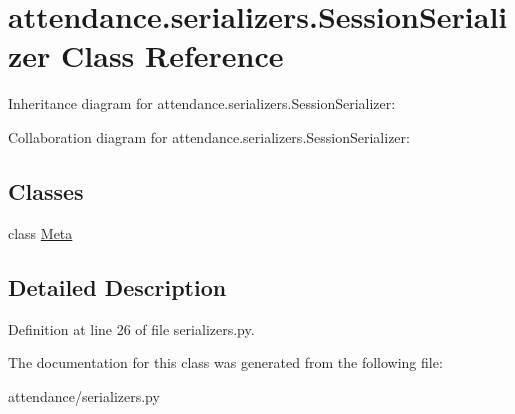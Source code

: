 \hypertarget{classattendance_1_1serializers_1_1_session_serializer}{}\section{attendance.\+serializers.\+Session\+Serializer Class Reference}
\label{classattendance_1_1serializers_1_1_session_serializer}


Inheritance diagram for attendance.\+serializers.\+Session\+Serializer\+:


Collaboration diagram for attendance.\+serializers.\+Session\+Serializer\+:
\subsection*{Classes}
\begin{DoxyCompactItemize}
\item 
class \hyperlink{classattendance_1_1serializers_1_1_session_serializer_1_1_meta}{Meta}
\end{DoxyCompactItemize}


\subsection{Detailed Description}


Definition at line 26 of file serializers.\+py.



The documentation for this class was generated from the following file\+:\begin{DoxyCompactItemize}
\item 
attendance/serializers.\+py\end{DoxyCompactItemize}
